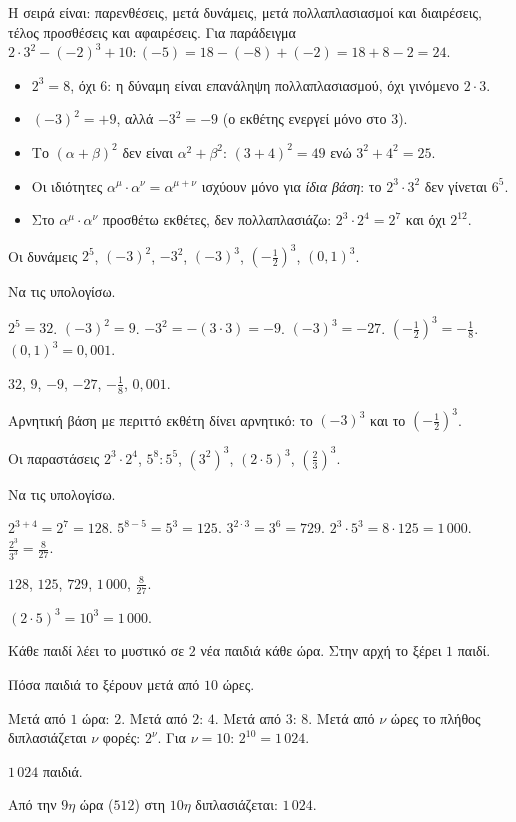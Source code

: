 Η σειρά είναι: παρενθέσεις, μετά δυνάμεις, μετά πολλαπλασιασμοί και διαιρέσεις, τέλος προσθέσεις και αφαιρέσεις. Για παράδειγμα $2\cdot3^2-(-2)^3+10:(-5)=18-(-8)+(-2)=18+8-2=24$.

\begin{prosoxi}
\begin{itemize}[leftmargin=1.2em,itemsep=0.3ex,topsep=2pt]
\item $2^3=8$, όχι $6$: η δύναμη είναι επανάληψη πολλαπλασιασμού, όχι γινόμενο $2\cdot3$.
\item $(-3)^2=+9$, αλλά $-3^2=-9$ (ο εκθέτης ενεργεί μόνο στο $3$).
\item Το $(\alpha+\beta)^2$ δεν είναι $\alpha^2+\beta^2$: $(3+4)^2=49$ ενώ $3^2+4^2=25$.
\item Οι ιδιότητες $\alpha^\mu\cdot\alpha^\nu=\alpha^{\mu+\nu}$ ισχύουν μόνο για \emph{ίδια βάση}: το $2^3\cdot3^2$ δεν γίνεται $6^5$.
\item Στο $\alpha^\mu\cdot\alpha^\nu$ προσθέτω εκθέτες, δεν πολλαπλασιάζω: $2^3\cdot2^4=2^7$ και όχι $2^{12}$.
\end{itemize}
\end{prosoxi}


\tixero Οι δυνάμεις $2^5$, $(-3)^2$, $-3^2$, $(-3)^3$, $\left(-\frac{1}{2}\right)^3$, $(0{,}1)^3$.\par
\tithelo Να τις υπολογίσω.\par
\possindeo $2^5=32$. $(-3)^2=9$. $-3^2=-(3\cdot3)=-9$. $(-3)^3=-27$. $\left(-\frac{1}{2}\right)^3=-\frac{1}{8}$. $(0{,}1)^3=0{,}001$.\par
\apantisi $32$, $9$, $-9$, $-27$, $-\frac{1}{8}$, $0{,}001$.\par
\elegxos Αρνητική βάση με περιττό εκθέτη δίνει αρνητικό: το $(-3)^3$ και το $\left(-\frac{1}{2}\right)^3$.

\tixero Οι παραστάσεις $2^3\cdot2^4$, $5^8:5^5$, $(3^2)^3$, $(2\cdot5)^3$, $\left(\frac{2}{3}\right)^3$.\par
\tithelo Να τις υπολογίσω.\par
\possindeo $2^{3+4}=2^7=128$. $5^{8-5}=5^3=125$. $3^{2\cdot3}=3^6=729$. $2^3\cdot5^3=8\cdot125=1\,000$. $\frac{2^3}{3^3}=\frac{8}{27}$.\par
\apantisi $128$, $125$, $729$, $1\,000$, $\frac{8}{27}$.\par
\elegxos $(2\cdot5)^3=10^3=1\,000$.

\tixero Κάθε παιδί λέει το μυστικό σε $2$ νέα παιδιά κάθε ώρα. Στην αρχή το ξέρει $1$ παιδί.\par
\tithelo Πόσα παιδιά το ξέρουν μετά από $10$ ώρες.\par
\possindeo Μετά από $1$ ώρα: $2$. Μετά από $2$: $4$. Μετά από $3$: $8$. Μετά από $\nu$ ώρες το πλήθος διπλασιάζεται $\nu$ φορές: $2^\nu$. Για $\nu=10$: $2^{10}=1\,024$.\par
\apantisi $1\,024$ παιδιά.\par
\elegxos Από την $9η$ ώρα ($512$) στη $10η$ διπλασιάζεται: $1\,024$.

